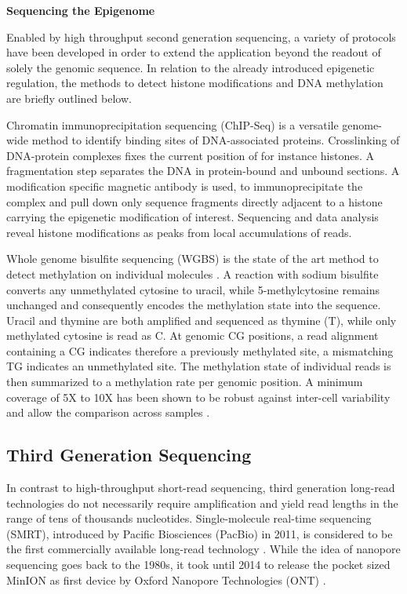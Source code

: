 \textbf{Sequencing the Epigenome}

Enabled by high throughput second generation sequencing, a variety of protocols have been developed in order to extend the application beyond the readout of solely the genomic sequence.
In relation to the already introduced epigenetic regulation, the methods to detect histone modifications and DNA methylation are briefly outlined below.

Chromatin immunoprecipitation sequencing (ChIP-Seq) is a versatile genome-wide method to identify binding sites of DNA-associated proteins.
Crosslinking of DNA-protein complexes fixes the current position of for instance histones. 
A fragmentation step separates the DNA in protein-bound and unbound sections.
A modification specific magnetic antibody is used, to immunoprecipitate the complex and pull down only sequence fragments directly adjacent to a histone carrying the epigenetic modification of interest.
Sequencing and data analysis reveal histone modifications as peaks from local accumulations of reads.

Whole genome bisulfite sequencing (WGBS) is the state of the art method to detect methylation on individual molecules \cite{Frommer1992}.
A reaction with sodium bisulfite converts any unmethylated cytosine to uracil, while 5-methylcytosine remains unchanged and consequently encodes the methylation state into the sequence. 
Uracil and thymine are both amplified and sequenced as thymine (T), while only methylated cytosine is read as C.
At genomic CG positions, a read alignment containing a CG indicates therefore a previously methylated site, a mismatching TG indicates an unmethylated site.
The methylation state of individual reads is then summarized to a methylation rate per genomic position.
A minimum coverage of 5X to 10X has been shown to be robust against inter-cell variability and allow the comparison across samples \cite{Ziller2015}.




\subsection{Third Generation Sequencing}
\label{subsec:intro:tgs}

In contrast to high-throughput short-read sequencing, third generation long-read technologies do not necessarily require amplification and yield read lengths in the range of tens of thousands nucleotides. 
Single-molecule real-time sequencing (SMRT), introduced by Pacific Biosciences (PacBio) in 2011, is considered to be the first commercially available long-read technology \cite{Dijk2018}.
While the idea of nanopore sequencing goes back to the 1980s, it took until 2014 to release the pocket sized MinION as first device by Oxford Nanopore Technologies (ONT) \cite{Deamer2016}.

